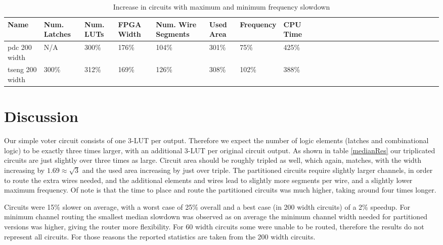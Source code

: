 \documentclass[12pt,final,oneside]{memoir} %
\begin{document}
\begin{table}
    \begin{adjustwidth}{-1cm}{-1.1cm}
        \begin{tabularx}{1.1\textwidth}{XXXXXXXXXXXXXXXXXXXXXXXXXX}
           \toprule
            Name & Num. Latches & Num. \acp{LUT} & FPGA Width & Num. Wire Segments & Used Area & Frequency & CPU Time\\
            \midrule
pdc 200 width   & N/A   & 300\% & 176\% & 104\% & 301\% &  75\% & 425\%\\
tseng 200 width & 300\% & 312\% & 169\% & 126\% & 308\% &  102\% & 388\%\\
          \bottomrule
        \end{tabularx}
        \caption{Increase in circuits with maximum and minimum frequency slowdown}
        \label{timing}
    \end{adjustwidth}
\end{table}
\section{Discussion}
Our simple voter circuit consists of one 3-\ac{LUT} per output. Therefore we expect the number of logic elements (latches and combinational logic) to be exactly three times larger, with an additional 3-\ac{LUT} per original circuit output. As shown in table \ref{medianRes} our triplicated circuits are just slightly over three times as large. Circuit area should be roughly tripled as well, which again, matches, with the width increasing by $1.69 \approx \sqrt{3}$ and the used area increasing by just over triple. The partitioned circuits require slightly larger channels, in order to route the extra wires needed, and the additional elements and wires lead to slightly more segments per wire, and a slightly lower maximum frequency. Of note is that the time to place and route the partitioned circuits was much higher, taking around four times longer.

Circuits were 15\% slower on average, with a worst case of 25\% overall and a best case (in 200 width circuits) of a 2\% speedup. For minimum channel routing the smallest median slowdown was observed as on average the minimum channel width needed for partitioned versions was higher, giving the router more flexibility. For 60 width circuits some were unable to be routed, therefore the results do not represent all circuits. For those reasons the reported statistics are taken from the 200 width circuits.
\end{document}

